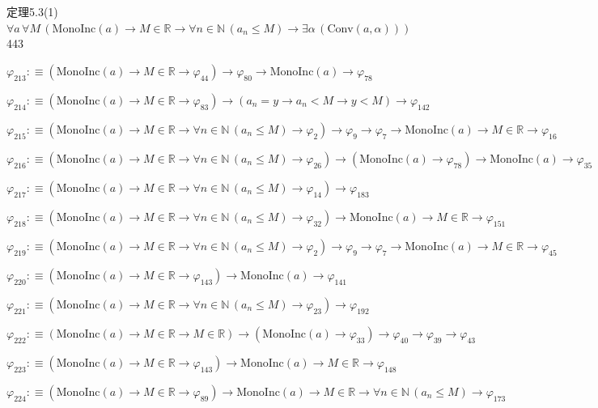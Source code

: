 \begin{fullproof}{定理5.3(1)}{$\forall a\,\forall M\,(\mathrm{MonoInc}(a) \to M \in \mathbb{R} \to \forall n \in \mathbb{N}\,(a_{n} \leq M) \to \exists \alpha\,(\mathrm{Conv}(a,\alpha)))$}{443}
\begin{abbrevlist}
\item $\varphi_{213} :\equiv (\mathrm{MonoInc}(a) \to M \in \mathbb{R} \to \varphi_{44}) \to \varphi_{80} \to \mathrm{MonoInc}(a) \to \varphi_{78}$
\item $\varphi_{214} :\equiv (\mathrm{MonoInc}(a) \to M \in \mathbb{R} \to \varphi_{83}) \to (a_{n} = y \to a_{n} < M \to y < M) \to \varphi_{142}$
\item $\varphi_{215} :\equiv (\mathrm{MonoInc}(a) \to M \in \mathbb{R} \to \forall n \in \mathbb{N}\,(a_{n} \leq M) \to \varphi_{2}) \to \varphi_{9} \to \varphi_{7} \to \mathrm{MonoInc}(a) \to M \in \mathbb{R} \to \varphi_{16}$
\item $\varphi_{216} :\equiv (\mathrm{MonoInc}(a) \to M \in \mathbb{R} \to \forall n \in \mathbb{N}\,(a_{n} \leq M) \to \varphi_{26}) \to (\mathrm{MonoInc}(a) \to \varphi_{78}) \to \mathrm{MonoInc}(a) \to \varphi_{35}$
\item $\varphi_{217} :\equiv (\mathrm{MonoInc}(a) \to M \in \mathbb{R} \to \forall n \in \mathbb{N}\,(a_{n} \leq M) \to \varphi_{14}) \to \varphi_{183}$
\item $\varphi_{218} :\equiv (\mathrm{MonoInc}(a) \to M \in \mathbb{R} \to \forall n \in \mathbb{N}\,(a_{n} \leq M) \to \varphi_{32}) \to \mathrm{MonoInc}(a) \to M \in \mathbb{R} \to \varphi_{151}$
\item $\varphi_{219} :\equiv (\mathrm{MonoInc}(a) \to M \in \mathbb{R} \to \forall n \in \mathbb{N}\,(a_{n} \leq M) \to \varphi_{2}) \to \varphi_{9} \to \varphi_{7} \to \mathrm{MonoInc}(a) \to M \in \mathbb{R} \to \varphi_{45}$
\item $\varphi_{220} :\equiv (\mathrm{MonoInc}(a) \to M \in \mathbb{R} \to \varphi_{143}) \to \mathrm{MonoInc}(a) \to \varphi_{141}$
\item $\varphi_{221} :\equiv (\mathrm{MonoInc}(a) \to M \in \mathbb{R} \to \forall n \in \mathbb{N}\,(a_{n} \leq M) \to \varphi_{23}) \to \varphi_{192}$
\item $\varphi_{222} :\equiv (\mathrm{MonoInc}(a) \to M \in \mathbb{R} \to M \in \mathbb{R}) \to (\mathrm{MonoInc}(a) \to \varphi_{33}) \to \varphi_{40} \to \varphi_{39} \to \varphi_{43}$
\item $\varphi_{223} :\equiv (\mathrm{MonoInc}(a) \to M \in \mathbb{R} \to \varphi_{143}) \to \mathrm{MonoInc}(a) \to M \in \mathbb{R} \to \varphi_{148}$
\item $\varphi_{224} :\equiv (\mathrm{MonoInc}(a) \to M \in \mathbb{R} \to \varphi_{89}) \to \mathrm{MonoInc}(a) \to M \in \mathbb{R} \to \forall n \in \mathbb{N}\,(a_{n} \leq M) \to \varphi_{173}$

\end{abbrevlist}
\end{fullproof}
